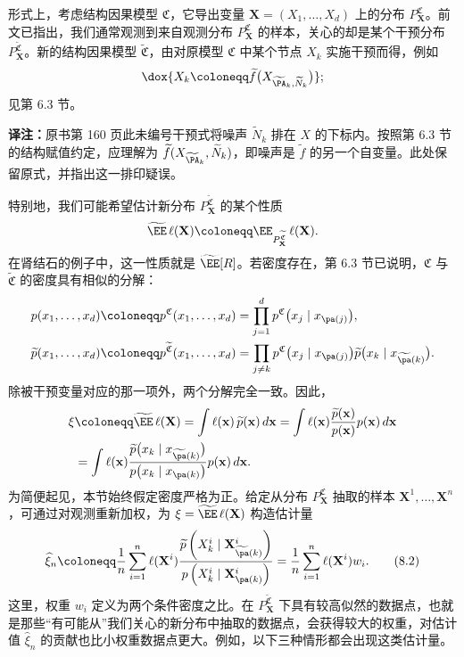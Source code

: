 形式上，考虑结构因果模型 $\mathfrak C$，它导出变量 $\mathbf X=(X_1,\ldots,X_d)$ 上的分布 $P^{\mathfrak C}_{\mathbf X}$。前文已指出，我们通常观测到来自观测分布 $P^{\mathfrak C}_{\mathbf X}$ 的样本，关心的却是某个干预分布 $P^{\widetilde{\mathfrak C}}_{\mathbf X}$。新的结构因果模型 $\widetilde{\mathfrak C}$，由对原模型 $\mathfrak C$ 中某个节点 $X_k$ 实施干预而得，例如
\[
 \dox{X_k\coloneqq\widetilde f\bigl(X_{\widetilde{\PA}_k,\widetilde N_k}\bigr)};
\]
见第 6.3 节。
\par\smallskip
{\small\noindent\textbf{译注：}原书第 160 页此未编号干预式将噪声 $\widetilde N_k$ 排在 $X$ 的下标内。按照第 6.3 节的结构赋值约定，应理解为 $\widetilde f(X_{\widetilde{\PA}_k},\widetilde N_k)$，即噪声是 $\widetilde f$ 的另一个自变量。此处保留原式，并指出这一排印疑误。}
\par\smallskip
特别地，我们可能希望估计新分布 $P^{\widetilde{\mathfrak C}}_{\mathbf X}$ 的某个性质
\[
 \widetilde{\EE}\,\ell(\mathbf X)
 \coloneqq\EE_{P^{\widetilde{\mathfrak C}}_{\mathbf X}}\,\ell(\mathbf X).
\]
在肾结石的例子中，这一性质就是 $\widetilde{\EE}[R]$。若密度存在，第 6.3 节已说明，$\mathfrak C$ 与 $\widetilde{\mathfrak C}$ 的密度具有相似的分解：
\[
 \begin{aligned}
 p(x_1,\ldots,x_d)&\coloneqq p^{\mathfrak C}(x_1,\ldots,x_d)
 =\prod_{j=1}^d p^{\mathfrak C}\bigl(x_j\mid x_{\pa(j)}\bigr),\\
 \widetilde p(x_1,\ldots,x_d)&\coloneqq p^{\widetilde{\mathfrak C}}(x_1,\ldots,x_d)
 =\prod_{j\neq k}p^{\mathfrak C}\bigl(x_j\mid x_{\pa(j)}\bigr)
 \widetilde p\bigl(x_k\mid x_{\widetilde{\pa}(k)}\bigr).
 \end{aligned}
\]
除被干预变量对应的那一项外，两个分解完全一致。因此，
\[
 \begin{aligned}
 \xi&\coloneqq\widetilde{\EE}\,\ell(\mathbf X)
 =\int \ell(\mathbf x)\,\widetilde p(\mathbf x)\,d\mathbf x
 =\int \ell(\mathbf x)\frac{\widetilde p(\mathbf x)}{p(\mathbf x)}p(\mathbf x)\,d\mathbf x\\
 &=\int \ell(\mathbf x)
 \frac{\widetilde p\bigl(x_k\mid x_{\widetilde{\pa}(k)}\bigr)}
 {p\bigl(x_k\mid x_{\pa(k)}\bigr)}p(\mathbf x)\,d\mathbf x.
 \end{aligned}
\]
为简便起见，本节始终假定密度严格为正。给定从分布 $P^{\mathfrak C}_{\mathbf X}$ 抽取的样本 $\mathbf X^1,\ldots,\mathbf X^n$，可通过对观测重新加权，为 $\xi=\widetilde{\EE}\,\ell(\mathbf X)$ 构造估计量
\begin{equation}
 \widehat\xi_n\coloneqq\frac1n\sum_{i=1}^n\ell(\mathbf X^i)
 \frac{\widetilde p\left(X_k^i\mid\mathbf X^i_{\widetilde{\pa}(k)}\right)}
 {p\left(X_k^i\mid\mathbf X^i_{\pa(k)}\right)}
 =\frac1n\sum_{i=1}^n\ell(\mathbf X^i)w_i.
 \tag{8.2}
\end{equation}
这里，权重 $w_i$ 定义为两个条件密度之比。在 $P^{\widetilde{\mathfrak C}}_{\mathbf X}$ 下具有较高似然的数据点，也就是那些“有可能从”我们关心的新分布中抽取的数据点，会获得较大的权重，对估计值 $\widehat\xi_n$ 的贡献也比小权重数据点更大。例如，以下三种情形都会出现这类估计量。

